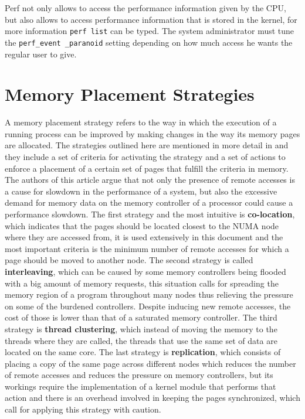 Perf not only allows to access the performance information given by the CPU, but also allows to access performance information that is stored in the kernel, for more information \texttt{perf list} can be typed. The system administrator must tune the \texttt{perf\_event \_paranoid} setting depending on how much access he wants the regular user to give. 

\section{Memory Placement Strategies}\label{section:placement strats}

A memory placement strategy refers to the way in which the execution of a running process can be improved by making changes in the way its memory pages are allocated. The strategies outlined here are mentioned in more detail in \cite{Dashti:2013} and they include a set of criteria for activating the strategy and a set of actions to enforce a placement of a certain set of pages that fulfill the criteria in memory. The authors of this article argue that not only the presence of remote accesses is a cause for slowdown in the performance of a system, but also the excessive demand for memory data on the memory controller of a processor could cause a performance slowdown.
The first strategy and the most intuitive is \textbf{co-location}, which indicates that the pages should be located closest to the NUMA node where they are accessed from, it is used extensively in this document and the most important criteria is the minimum number of remote accesses for which a page should be moved to another node. The second strategy is called \textbf{interleaving}, which can be caused by some memory controllers being flooded with a big amount of memory requests, this situation calls for spreading the memory region of a program throughout many nodes thus relieving the pressure on some of the burdened controllers. Despite inducing new remote accesses, the cost of those is lower than that of a saturated memory controller. The third strategy is \textbf{thread clustering}, which instead of moving the memory to the threads where they are called, the threads that use the same set of data are located on the same core. The last strategy is \textbf{replication}, which consists of placing a copy of the same page across different nodes which reduces the number of remote accesses and reduces the pressure on memory controllers, but its workings require the implementation of a kernel module that performs that action and there is an overhead involved in keeping the pages synchronized, which call for applying this strategy with caution.

